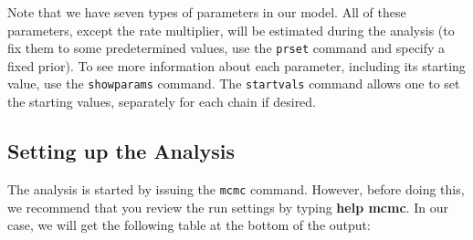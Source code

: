 \documentclass[12pt]{book}
\begin{document}
Note that we have seven types of parameters in our model. All of these parameters, except the rate multiplier,
 will be estimated during the analysis (to fix them to some predetermined values, use the \texttt{prset}
 command and specify a fixed prior). To see more information about each parameter, including its starting
 value, use the \texttt{showparams} command. The \texttt{startvals} command allows one to set the starting
 values, separately for each chain if desired.

\subsection{Setting up the Analysis}

The analysis is started by issuing the \texttt{mcmc} command. However, before doing this, we recommend that
 you review the run settings by typing \textbf{help mcmc}. In our case, we will get the following table at
 the bottom of the output:
\end{document}
